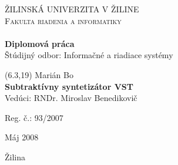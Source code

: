 \begin{titlepage}
 
\begin{center}
 
 
\textsc{\LARGE ŽILINSKÁ UNIVERZITA V ŽILINE}\\[0.5cm]
\textsc{\Large Fakulta riadenia a informatiky}\\[4.5cm]
 
 
\HRule \\[0.4cm]
{ \huge \bfseries \sc Diplomová práca}\\[0.4cm]
Štúdijný odbor: Informačné a riadiace systémy
\HRule \\[1.5cm]
 
\begin{textblock}{10}(6.3,19)
\centering
Marián Bo\\[0.6cm]

{\Large \bfseries Subtraktívny syntetizátor VST}\\[0.6cm]

Vedúci: RNDr. Miroslav Benedikovič\\


\begin{minipage}{0.4\textwidth}
\begin{flushleft}
Reg. č.: 93/2007
\end{flushleft}
\end{minipage}
\begin{minipage}{0.4\textwidth}
\begin{flushright}
Máj 2008
\end{flushright}
\end{minipage}

\end{textblock}
 
\vfill
{\large Žilina}
 
\end{center}
 
\end{titlepage}